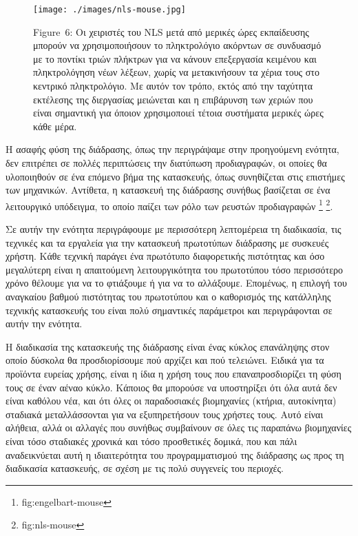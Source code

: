 \documentclass[
]{article}
\begin{document}
\leavevmode{}%
\begin{figure}
\hypertarget{fig:nls-mouse}{%
\centering
\texttt{[image: ./images/nls-mouse.jpg]}
\caption{Figure~6: Οι χειριστές του NLS μετά από μερικές ώρες
εκπαίδευσης μπορούν να χρησιμοποιήσουν το πληκτρολόγιο ακόρντων σε
συνδυασμό με το ποντίκι τριών πλήκτρων για να κάνουν επεξεργασία
κειμένου και πληκτρολόγηση νέων λέξεων, χωρίς να μετακινήσουν τα χέρια
τους στο κεντρικό πληκτρολόγιο. Με αυτόν τον τρόπο, εκτός από την
ταχύτητα εκτέλεσης της διεργασίας μειώνεται και η επιβάρυνση των χεριών
που είναι σημαντική για όποιον χρησιμοποιεί τέτοια συστήματα μερικές
ώρες κάθε μέρα.}\label{fig:nls-mouse}
}
\end{figure}

Η ασαφής φύση της διάδρασης, όπως την περιγράψαμε στην προηγούμενη
ενότητα, δεν επιτρέπει σε πολλές περιπτώσεις την διατύπωση προδιαγραφών,
οι οποίες θα υλοποιηθούν σε ένα επόμενο βήμα της κατασκευής, όπως
συνηθίζεται στις επιστήμες των μηχανικών. Αντίθετα, η κατασκευή της
διάδρασης συνήθως βασίζεται σε ένα λειτουργικό υπόδειγμα, το οποίο
παίζει των ρόλο των ρευστών προδιαγραφών \footnote{fig:engelbart-mouse}
\footnote{fig:nls-mouse}.

Σε αυτήν την ενότητα περιγράφουμε με περισσότερη λεπτομέρεια τη
διαδικασία, τις τεχνικές και τα εργαλεία για την κατασκευή πρωτοτύπων
διάδρασης με συσκευές χρήστη. Κάθε τεχνική παράγει ένα πρωτότυπο
διαφορετικής πιστότητας και όσο μεγαλύτερη είναι η απαιτούμενη
λειτουργικότητα του πρωτοτύπου τόσο περισσότερο χρόνο θέλουμε για να το
φτιάξουμε ή για να το αλλάξουμε. Επομένως, η επιλογή του αναγκαίου
βαθμού πιστότητας του πρωτοτύπου και ο καθορισμός της κατάλληλης
τεχνικής κατασκευής του είναι πολύ σημαντικές παράμετροι και
περιγράφονται σε αυτήν την ενότητα.

Η διαδικασία της κατασκευής της διάδρασης είναι ένας κύκλος επανάληψης
στον οποίο δύσκολα θα προσδιορίσουμε πού αρχίζει και πού τελειώνει.
Ειδικά για τα προϊόντα ευρείας χρήσης, είναι η ίδια η χρήση τους που
επαναπροσδιορίζει τη φύση τους σε έναν αέναο κύκλο. Κάποιος θα μπορούσε
να υποστηρίξει ότι όλα αυτά δεν είναι καθόλου νέα, και ότι όλες οι
παραδοσιακές βιομηχανίες (κτήρια, αυτοκίνητα) σταδιακά μεταλλάσσονται
για να εξυπηρετήσουν τους χρήστες τους. Αυτό είναι αλήθεια, αλλά οι
αλλαγές που συνήθως συμβαίνουν σε όλες τις παραπάνω βιομηχανίες είναι
τόσο σταδιακές χρονικά και τόσο προσθετικές δομικά, που και πάλι
αναδεικνύεται αυτή η ιδιαιτερότητα του προγραμματισμού της διάδρασης ως
προς τη διαδικασία κατασκευής, σε σχέση με τις πολύ συγγενείς του
περιοχές.
\end{document}
